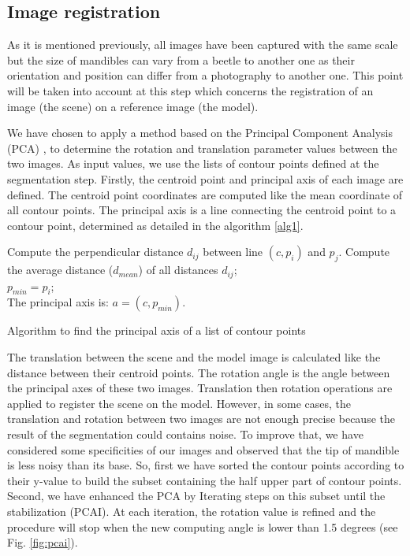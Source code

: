 \documentclass[twoside,twocolumn,10pt]{article}
\begin{document}
\subsection{Image registration}

As it is mentioned previously, all images have been captured with the
same scale but the size of mandibles can vary from a beetle to another
one as their orientation and position can differ from a
photography to another one. This point will be taken into account at
this step which concerns the registration of
an image (the scene) on a reference image (the model).

We have chosen to apply a method based on the Principal Component Analysis (PCA) \cite{bsspca}, \cite{shlens2014tutorial} to determine the rotation and translation parameter values between the two images.
As input values, we use the lists of contour points defined at the segmentation step.
Firstly, the centroid point and principal axis of each image are defined.
The centroid point coordinates are computed like the mean coordinate of all contour points.
The principal axis is a line connecting the centroid point to a
contour point, determined as detailed in the algorithm \ref{alg1}.

\begin{algorithm}
	{
		{
			{
				Compute the perpendicular distance $d_{ij}$ between line $(c,p_i)$ and $p_j$.
			}		
		}
		Compute the average distance ($d_{mean}$) of all distances $d_{ij}$;\\

		{
			$p_{min} = p_i$;\\
		}
	}
	The principal axis is: $a = (c,p_{min})$.
	\caption{Algorithm to find the principal axis of a list of contour points}
	\label{alg1}
\end{algorithm}

The translation between the scene and the model image is calculated like the distance between their centroid
points. The rotation angle is the angle between the principal axes of
these two images. Translation then rotation operations are applied to
register the scene on the model. However, in some cases, the
translation and rotation between two images are 
not enough precise because the result of the segmentation could
contains noise. To improve that, we have considered some specificities of our
 images and observed that the tip of mandible is less
 noisy than its base. So, first we have sorted the contour
 points according to their y-value to build the subset
 containing the half upper part of contour points. Second, we have
 enhanced the PCA by Iterating steps on this subset until the stabilization
 (PCAI). At each iteration, the rotation value is refined and the
 procedure will stop when the new computing angle is lower than 1.5 degrees (see
 Fig. \ref{fig:pcai}).
\end{document}
